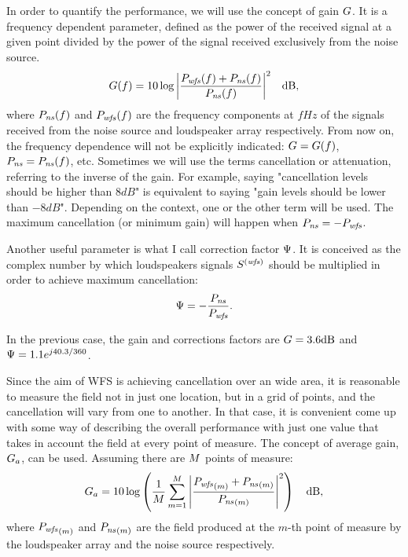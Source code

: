 In order to quantify the performance, we will use the concept of gain $\gain$. It is a frequency dependent parameter, defined as the power of the received signal at a given point divided by the power of the signal received exclusively from the noise source. %
\begin{gather}
\gain(f) = 10\log{\left\lvert\frac{\Field[wfs][frequency](f) + \Field[ns][frequency](f)}{\Field[ns][frequency](f)}\right\rvert^2}\quad\si{dB},%
\end{gather}
where $\Field[ns][frequency](f)$ and $\Field[wfs][frequency](f)$ are the frequency components at $f \si{Hz}$ of the signals received from the noise source and loudspeaker array respectively. From now on, the frequency dependence will not be explicitly indicated: $\gain = \gain(f)$, $\Field[ns][frequency] = \Field[ns][frequency](f)$, etc. Sometimes we will use the terms cancellation or attenuation, referring to the inverse of the gain. For example, saying "cancellation levels should be higher than $8 \si{dB}$" is equivalent to saying "gain levels should be lower than $-8 \si{dB}$". Depending on the context, one or the other term will be used.
The maximum cancellation (or minimum gain) will happen when $\Field[ns][frequency] = -\Field[wfs][frequency]$.

Another useful parameter is what I call correction factor $\correctionFactor$. It is conceived as the complex number by which loudspeakers signals $\signal[wfs][frequency]$ should be multiplied in order to achieve maximum cancellation:
\begin{equation}
\correctionFactor = -\frac{\Field[ns][frequency]}{\Field[wfs][frequency]}.
\end{equation}

In the previous case, the gain and corrections factors are $\gain = 3.6\si{dB}$ and $\correctionFactor = 1.1 e^{j40.3/360}$.

Since the aim of WFS is achieving cancellation over an wide area, it is reasonable to measure the field not in just one location, but in a grid of points, and the cancellation will vary from one to another. In that case, it is convenient come up with some way of describing the overall performance with just one value that takes in account the field at every point of measure.
The concept of average gain, $\averageGain$, can be used. Assuming there are $\numMeasPoints$ points of measure:
\begin{equation}
	\averageGain = 10\log\left(\frac{1}{\numMeasPoints} \sum_{m=1}^\numMeasPoints \abs{\frac{\Field[wfs][frequency][scalar][m] + \Field[ns][frequency][scalar][m]}{\Field[ns][frequency][scalar][m]}}^2\right) \quad \si{dB},
\end{equation}
where $\Field[wfs][frequency][scalar][m]$ and $\Field[ns][frequency][scalar][m]$ are the field produced at the $m$-th point of measure by the loudspeaker array and the noise source respectively.

